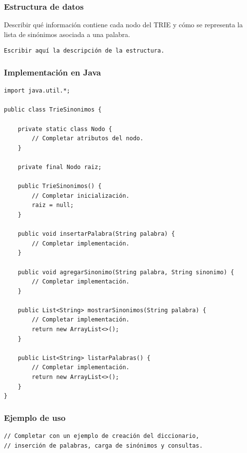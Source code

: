 \documentclass[11pt]{article}
\begin{document}
\subsubsection{Estructura de datos}
\label{sec:org2476f08}

Describir qué información contiene cada nodo del TRIE y cómo se representa la lista de sinónimos asociada a una palabra.

\begin{verbatim}
Escribir aquí la descripción de la estructura.
\end{verbatim}

\subsubsection{Implementación en Java}
\label{sec:orgd2c22b1}

\begin{verbatim}
import java.util.*;

public class TrieSinonimos {

    private static class Nodo {
        // Completar atributos del nodo.
    }

    private final Nodo raiz;

    public TrieSinonimos() {
        // Completar inicialización.
        raiz = null;
    }

    public void insertarPalabra(String palabra) {
        // Completar implementación.
    }

    public void agregarSinonimo(String palabra, String sinonimo) {
        // Completar implementación.
    }

    public List<String> mostrarSinonimos(String palabra) {
        // Completar implementación.
        return new ArrayList<>();
    }

    public List<String> listarPalabras() {
        // Completar implementación.
        return new ArrayList<>();
    }
}
\end{verbatim}

\subsubsection{Ejemplo de uso}
\label{sec:org255a8d6}

\begin{verbatim}
// Completar con un ejemplo de creación del diccionario,
// inserción de palabras, carga de sinónimos y consultas.
\end{verbatim}
\end{document}
